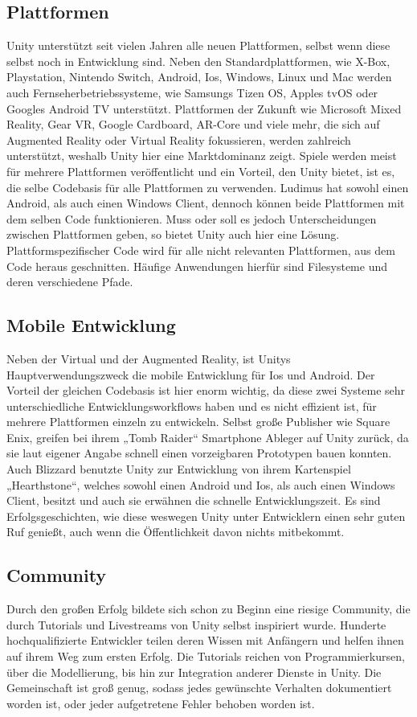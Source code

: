 \subsection{Plattformen}
Unity unterstützt seit vielen Jahren alle neuen Plattformen, selbst wenn diese selbst noch in Entwicklung sind. Neben den Standardplattformen, wie X-Box, Playstation, Nintendo Switch, Android, Ios, Windows, Linux und Mac werden auch Fernseherbetriebssysteme, wie Samsungs Tizen OS, Apples tvOS oder Googles Android TV unterstützt. Plattformen der Zukunft wie Microsoft Mixed Reality, Gear VR, Google Cardboard, AR-Core und viele mehr, die sich auf Augmented Reality oder Virtual Reality fokussieren, werden zahlreich unterstützt, weshalb Unity hier eine Marktdominanz zeigt. Spiele werden meist für mehrere Plattformen veröffentlicht und ein Vorteil, den Unity bietet, ist es, die selbe Codebasis für alle Plattformen zu verwenden. Ludimus hat sowohl einen Android, als auch einen Windows Client, dennoch können beide Plattformen mit dem selben Code funktionieren. Muss oder soll es jedoch Unterscheidungen zwischen Plattformen geben, so bietet Unity auch hier eine Lösung. Plattformspezifischer Code wird für alle nicht relevanten Plattformen, aus dem Code heraus geschnitten. Häufige Anwendungen hierfür sind Filesysteme und deren verschiedene Pfade. 

\subsection{Mobile Entwicklung}
Neben der Virtual und der Augmented Reality, ist Unitys Hauptverwendungszweck die mobile Entwicklung für Ios und Android. Der Vorteil der gleichen Codebasis ist hier enorm wichtig, da diese zwei Systeme sehr unterschiedliche Entwicklungsworkflows haben und es nicht effizient ist, für mehrere Plattformen einzeln zu entwickeln. Selbst große Publisher wie Square Enix, greifen bei ihrem „Tomb Raider“ Smartphone Ableger auf Unity zurück, da sie laut eigener Angabe schnell einen vorzeigbaren Prototypen bauen konnten. Auch Blizzard benutzte Unity zur Entwicklung von ihrem Kartenspiel „Hearthstone“, welches sowohl einen Android und Ios, als auch einen Windows Client, besitzt und auch sie erwähnen die schnelle Entwicklungszeit. Es sind Erfolgsgeschichten, wie diese weswegen Unity unter Entwicklern einen sehr guten Ruf genießt, auch wenn die Öffentlichkeit davon nichts mitbekommt. 

\subsection{Community}
Durch den großen Erfolg bildete sich schon zu Beginn eine riesige Community, die durch Tutorials und Livestreams von Unity selbst inspiriert wurde. Hunderte hochqualifizierte Entwickler teilen deren Wissen mit Anfängern und helfen ihnen auf ihrem Weg zum ersten Erfolg. Die Tutorials reichen von Programmierkursen, über die Modellierung, bis hin zur Integration anderer Dienste in Unity. Die Gemeinschaft ist groß genug, sodass jedes gewünschte Verhalten dokumentiert worden ist, oder jeder aufgetretene Fehler behoben worden ist.


